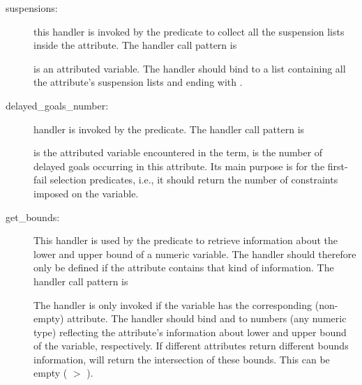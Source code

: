 \begin{description}
\item [suspensions:]
  this handler is invoked by the
 predicate
to collect all the suspension lists inside the attribute.
The handler call pattern is
\begin{quote}
\end{quote}
 is an attributed variable. The handler should bind
 to a list containing all the attribute's
suspension lists and ending with .


\item [delayed_goals_number:]
  handler is invoked by the
predicate.
The handler call pattern is
\begin{quote}
\end{quote}
 is the attributed variable encountered in the
term,  is the number of delayed
goals occurring in this attribute.
Its main purpose is for the first-fail selection predicates,
i.e., it should return the number of constraints imposed on
the variable.

\item [get_bounds:]
    This handler is used by the predicate
    to retrieve information about the lower and upper bound of a numeric
    variable.
    The handler should therefore only be defined if the attribute contains
    that kind of information. The handler call pattern is
    \begin{quote}
    \end{quote}
    The handler is only invoked if the variable has the corresponding
    (non-empty) attribute.
    The handler should bind  and  to numbers
    (any numeric type) reflecting the attribute's information about lower
    and upper bound of the variable, respectively.
    If different attributes return different bounds information,
    will return the intersection of these bounds. This can be empty
    ( $>$ ).


\end{description}
